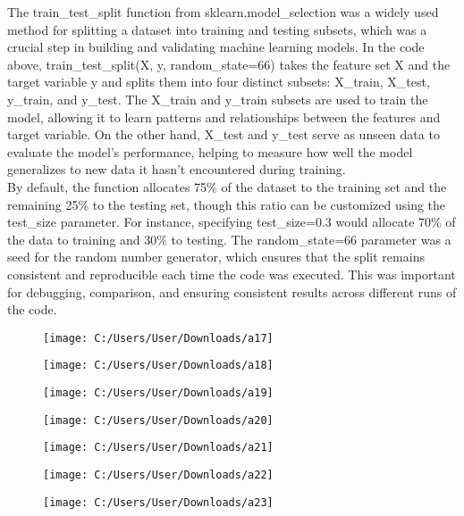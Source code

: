\documentclass[12pt]{article}
\begin{document}
The train\_test\_split function from sklearn.model\_selection was a widely used method for splitting a dataset into training and testing subsets, which was a crucial step in building and validating machine learning models. In the code above, train\_test\_split(X, y, random\_state=66) takes the feature set X and the target variable y and splits them into four distinct subsets: X\_train, X\_test, y\_train, and y\_test. The X\_train and y\_train subsets are used to train the model, allowing it to learn patterns and relationships between the features and target variable. On the other hand, X\_test and y\_test serve as unseen data to evaluate the model's performance, helping to measure how well the model generalizes to new data it hasn’t encountered during training.\\
\indent By default, the function allocates 75\% of the dataset to the training set and the remaining 25\% to the testing set, though this ratio can be customized using the test\_size parameter. For instance, specifying test\_size=0.3 would allocate 70\% of the data to training and 30\% to testing. The random\_state=66 parameter was a seed for the random number generator, which ensures that the split remains consistent and reproducible each time the code was executed. This was important for debugging, comparison, and ensuring consistent results across different runs of the code.\\
\vspace{-10mm}
\begin{figure}[h!]
	\centering
	\texttt{[image: C:/Users/User/Downloads/a17]}
\end{figure}
\vspace{-10mm}
\begin{figure}[h!]
	\centering
	\texttt{[image: C:/Users/User/Downloads/a18]}
\end{figure}
\vspace{-10mm}
\begin{figure}[h!]
	\centering
	\texttt{[image: C:/Users/User/Downloads/a19]}
\end{figure}

\newpage
\begin{figure}[h!]
	\centering
	\texttt{[image: C:/Users/User/Downloads/a20]}
\end{figure}
\vspace{-10mm}
\begin{figure}[h!]
	\centering
	\texttt{[image: C:/Users/User/Downloads/a21]}
\end{figure}
\vspace{-10mm}
\begin{figure}[h!]
	\centering
	\texttt{[image: C:/Users/User/Downloads/a22]}
\end{figure}
\newpage
\begin{figure}[h!]
	\centering
	\texttt{[image: C:/Users/User/Downloads/a23]}
\end{figure}
\vspace{-6mm}
\end{document}
